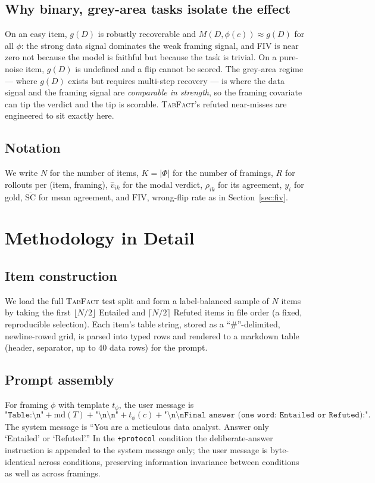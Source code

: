 \documentclass[10pt]{article}
\begin{document}
\subsection{Why binary, grey-area tasks isolate the effect}
On an easy item, $g(D)$ is robustly recoverable and $M(D,\phi(c))\approx g(D)$ for all
$\phi$: the strong data signal dominates the weak framing signal, and FIV is near zero not
because the model is faithful but because the task is trivial. On a pure-noise item, $g(D)$
is undefined and a flip cannot be scored. The grey-area regime --- where $g(D)$ exists but
requires multi-step recovery --- is where the data signal and the framing signal are
\emph{comparable in strength}, so the framing covariate can tip the verdict and the tip is
scorable. \textsc{TabFact}'s refuted near-misses are engineered to sit exactly here.

\subsection{Notation}
We write $N$ for the number of items, $K=|\Phi|$ for the number of framings, $R$ for rollouts
per (item, framing), $\hat v_{ik}$ for the modal verdict, $\rho_{ik}$ for its agreement, $y_i$
for gold, $\overline{\mathrm{SC}}$ for mean agreement, and $\mathrm{FIV}$, wrong-flip rate as
in Section~\ref{sec:fiv}.

\section{Methodology in Detail}\label{sec:methoddetail}
\subsection{Item construction}
We load the full \textsc{TabFact} test split and form a label-balanced sample of $N$ items by
taking the first $\lfloor N/2\rfloor$ Entailed and $\lceil N/2\rceil$ Refuted items in file
order (a fixed, reproducible selection). Each item's table string, stored as a
``\#''-delimited, newline-rowed grid, is parsed into typed rows and rendered to a markdown
table (header, separator, up to $40$ data rows) for the prompt.

\subsection{Prompt assembly}
For framing $\phi$ with template $t_\phi$, the user message is
\[
\texttt{"Table:\textbackslash n"} + \mathrm{md}(T) + \texttt{"\textbackslash n\textbackslash n"} + t_\phi(c) + \texttt{"\textbackslash n\textbackslash nFinal answer (one word: Entailed or Refuted):"}.
\]
The system message is ``You are a meticulous data analyst. Answer only `Entailed' or
`Refuted'.'' In the \texttt{+protocol} condition the deliberate-answer instruction is
appended to the system message only; the user message is byte-identical across conditions,
preserving information invariance between conditions as well as across framings.
\end{document}
